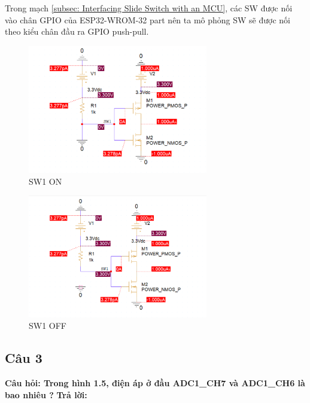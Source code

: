 Trong mạch \ref{subsec: Interfacing Slide Switch with an MCU}, các SW được nối vào chân GPIO của ESP32-WROM-32 part nên ta mô phỏng SW sẽ được nối theo kiểu chân đầu ra GPIO push-pull.

\begin{figure}[ht]
    \centering
    \includegraphics[width=0.7\textwidth]{graphics/section5/f1.png}
    \caption{SW1 ON}
\end{figure}

\begin{figure}[ht]
    \centering
    \includegraphics[width=0.7\textwidth]{graphics/section5/f2.png}
    \caption{SW1 OFF}
\end{figure}

\pagebreak
\subsection{Câu 3}
\textbf{Câu hỏi: Trong hình 1.5, điện áp ở đầu ADC1\_CH7 và ADC1\_CH6 là bao nhiêu ?}
\textbf{Trả lời:}

